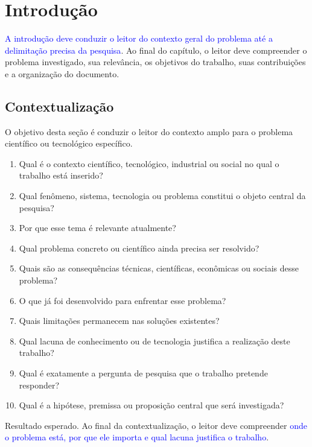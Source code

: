 \newpage

\chapter{Introdução}

\textcolor{blue}{A introdução deve conduzir o leitor do contexto geral do problema até a
delimitação precisa da pesquisa}. Ao final do capítulo, o leitor deve
compreender o problema investigado, sua relevância, os objetivos do trabalho,
suas contribuições e a organização do documento.

\section{Contextualização}

O objetivo desta seção é conduzir o leitor do contexto amplo para o problema
científico ou tecnológico específico.

\begin{enumerate}
	\item Qual é o contexto científico, tecnológico, industrial ou social no qual o trabalho está inserido?
	\item Qual fenômeno, sistema, tecnologia ou problema constitui o objeto central da pesquisa?
	\item Por que esse tema é relevante atualmente?
	\item Qual problema concreto ou científico ainda precisa ser resolvido?
	\item Quais são as consequências técnicas, científicas, econômicas ou sociais desse problema?
	\item O que já foi desenvolvido para enfrentar esse problema?
	\item Quais limitações permanecem nas soluções existentes?
	\item Qual lacuna de conhecimento ou de tecnologia justifica a realização deste trabalho?
	\item Qual é exatamente a pergunta de pesquisa que o trabalho pretende responder?
	\item Qual é a hipótese, premissa ou proposição central que será investigada?
\end{enumerate}

{Resultado esperado.}
Ao final da contextualização, o leitor deve compreender
\textcolor{blue}{onde o problema está, por que ele importa e qual lacuna justifica o
	trabalho}.

